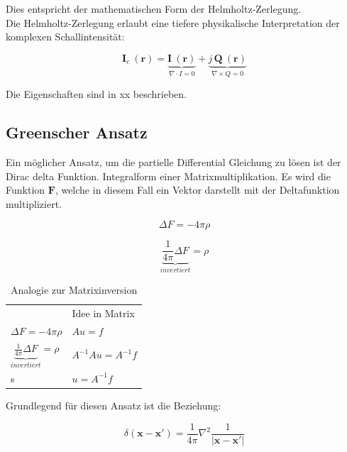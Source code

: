 Dies entspricht der mathematischen Form der Helmholtz-Zerlegung.\\

Die Helmholtz-Zerlegung erlaubt eine tiefere physikalische Interpretation der komplexen Schallintensität:

\begin{equation}
\mathbf{I}_c ~(\mathbf{r}) = \underbrace{\mathbf{I}~(\mathbf{r})}_{\nabla \cdot I = 0} + \underbrace{j\,\mathbf{Q}~(\mathbf{r})}_{\nabla \times Q = 0}
\label{helmholtz:KomplexeIntensitaet_Zerlegung}
\end{equation}

Die Eigenschaften sind in xx beschrieben.


\subsection{Greenscher Ansatz}
Ein möglicher Ansatz, um die partielle Differential Gleichung zu lösen ist der Dirac delta Funktion. Integralform einer Matrixmultiplikation. Es wird die Funktion $\mathbf{F}$, welche in diesem Fall ein Vektor darstellt mit der Deltafunktion multipliziert.

\begin{equation}
\Delta F = -4 \pi \rho 
\label{helmholtz:DGL_idee}
\end{equation}

\begin{equation}
\underbrace{\frac{1}{4 \pi} \Delta F}_{invertiert} = \rho 
\label{helmholtz:DGL_idee_umformung}
\end{equation}

\begin{table}[h]
\centering
\begin{tabular}{ll}
  & Idee in Matrix \\
$\Delta F = -4 \pi \rho$  & $Au = f$ \\
$\underbrace{\frac{1}{4 \pi} \Delta F}_{invertiert} = \rho$ & $A^{-1}Au = A^{-1}f$  \\
s & $u = A^{-1}f$  \\
\end{tabular}
\caption{Analogie zur Matrixinversion}
\end{table}

Grundlegend für diesen Ansatz ist die Beziehung:

\begin{equation}
\delta (\mathbf{x} - \mathbf{x'}) = \frac{1}{4 \pi} \nabla^2 \frac{1}{|\mathbf{x} - \mathbf{x'}|}
\label{helmholtz:dirac}
\end{equation}

